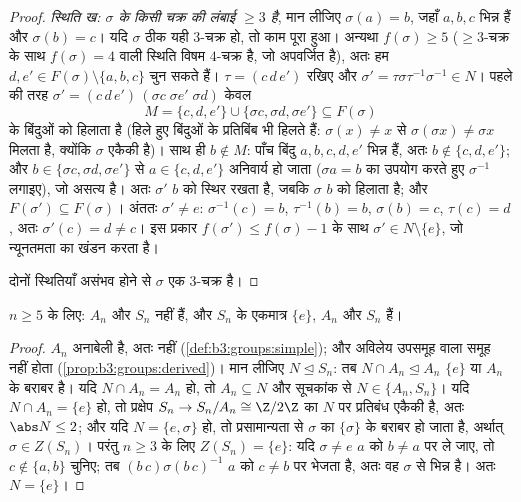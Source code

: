\begin{proof}
\emph{स्थिति ख: $\sigma$ के किसी चक्र की लंबाई $\geq 3$ है}, मान
लीजिए $\sigma(a) = b$, जहाँ $a, b, c$ भिन्न हैं और $\sigma(b) = c$। यदि $\sigma$ ठीक यही
$3$-चक्र हो, तो काम पूरा हुआ। अन्यथा $f(\sigma) \geq 5$ ($\geq3$-चक्र के साथ
$f(\sigma) = 4$ वाली स्थिति विषम $4$-चक्र है, जो अपवर्जित है), अतः हम
$d, e' \in
F(\sigma) \setminus \{a, b, c\}$ चुन सकते हैं। $\tau = (c\,d\,e')$ रखिए और $\sigma' = \tau\sigma\tau^{-1}\sigma^{-1} \in N$। पहले की तरह $\sigma' = (c\,d\,e')\,(\sigma c\;\sigma e'\;\sigma d)$
केवल
\[
M = \{c, d, e'\} \cup \{\sigma c, \sigma d, \sigma e'\}
\subseteq F(\sigma)
\]
के बिंदुओं को हिलाता है (हिले हुए बिंदुओं के प्रतिबिंब भी हिलते
हैं: $\sigma(x) \ne x$ से $\sigma(\sigma x) \neq \sigma x$ मिलता है, क्योंकि $\sigma$ एकैकी है)। साथ ही
$b \notin M$: पाँच बिंदु $a, b, c, d, e'$ भिन्न हैं, अतः $b
\notin \{c, d, e'\}$; और $b \in \{\sigma c, \sigma d, \sigma
e'\}$ से $a \in \{c, d, e'\}$
अनिवार्य हो जाता ($\sigma a = b$ का उपयोग करते हुए $\sigma^{-1}$ लगाइए), जो असत्य
है। अतः $\sigma'$ $b$ को स्थिर रखता है, जबकि $\sigma$ $b$ को हिलाता
है; और $F(\sigma') \subseteq F(\sigma)$। अंततः $\sigma' \neq e$: $\sigma^{-1}(c) = b$, $\tau^{-1}(b) = b$, $\sigma(b) = c$, $\tau(c) = d$, अतः
$\sigma'(c) = d \neq c$। इस प्रकार $f(\sigma') \leq f(\sigma) - 1$ के साथ $\sigma' \in N
\setminus \{e\}$, जो न्यूनतमता का खंडन करता
है।

दोनों स्थितियाँ असंभव होने से $\sigma$ एक $3$-चक्र है।
\end{proof}

\begin{corollary}\label{cor:b3:groups:snnotsolvable}
$n \geq 5$ के लिए: $A_n$ और $S_n$  नहीं हैं, और $S_n$ के
एकमात्र  $\{e\}$, $A_n$ और $S_n$ हैं।
\end{corollary}

\begin{proof}
$A_n$ अनाबेली  है, अतः  नहीं (\cref{def:b3:groups:simple}); और अविलेय उपसमूह
वाला समूह  नहीं होता (\cref{prop:b3:groups:derived})। मान लीजिए $N
\trianglelefteq S_n$: तब $N \cap A_n \trianglelefteq A_n$
$\{e\}$ या $A_n$ के बराबर है। यदि $N \cap A_n = A_n$ हो, तो $A_n \subseteq N$ और सूचकांक से
$N \in \{A_n, S_n\}$। यदि $N \cap A_n = \{e\}$ हो, तो प्रक्षेप $S_n \to S_n/A_n \cong
\Z/2\Z$ का $N$ पर प्रतिबंध
एकैकी है, अतः $\abs N \leq 2$; और यदि $N = \{e, \sigma\}$ हो, तो प्रसामान्यता से $\sigma$
का  $\{\sigma\}$ के बराबर हो जाता है, अर्थात् $\sigma \in Z(S_n)$। परंतु
$n \geq 3$ के लिए $Z(S_n) = \{e\}$: यदि $\sigma \ne e$ $a$ को $b \neq a$ पर ले जाए, तो
$c
\notin \{a, b\}$ चुनिए; तब $(b\,c)\sigma(b\,c)^{-1}$ $a$ को $c
\ne b$ पर भेजता है, अतः वह $\sigma$
से भिन्न है। अतः $N = \{e\}$।
\end{proof}

